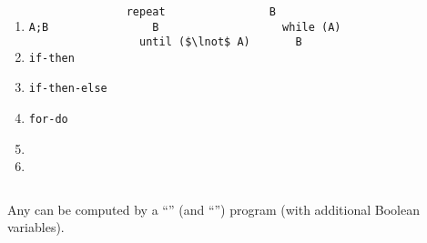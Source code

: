 \begin{frame}[fragile]{}
  \begin{columns}
      \begin{enumerate}[(1)]
	\item \texttt{A;B}
	\item \texttt{if-then} 
	\item \texttt{if-then-else} 
	\item \texttt{for-do} 
	\item {} 
	\item {}
      \end{enumerate}
      \pause
      \begin{lstlisting}[style = Cstyle, backgroundcolor = \color{teal!10!lightgray}]
  repeat
    B
  until ($\lnot$ A)
      \end{lstlisting}
      \pause
      \begin{lstlisting}[style = Cstyle]
  B
  while (A)
    B
      \end{lstlisting}
  \end{columns}

  \vspace{0.60cm}
  \pause
  \begin{theorem}
     Any  can be computed by a 
    ``'' (and ``\red{\textsf{;}}'') program
    (with additional Boolean variables).
  \end{theorem}
\end{frame}

\begin{frame}{}
  \begin{columns}
  \end{columns}

  \pause
  \begin{columns}
  \end{columns}
\end{frame}
